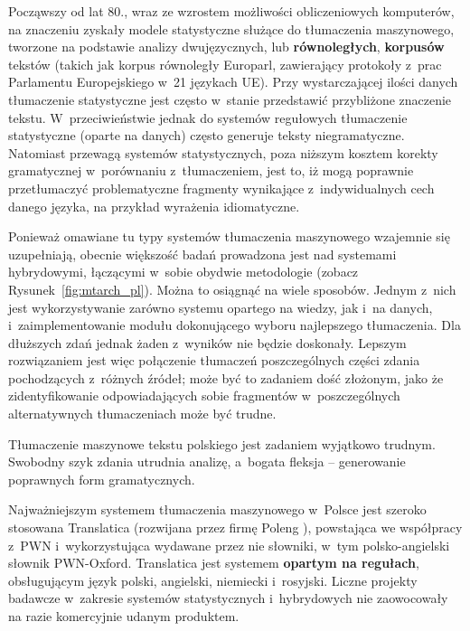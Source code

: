 \begin{multicols}{2}
Począwszy od lat 80., wraz ze wzrostem możliwości obliczeniowych
komputerów, na znaczeniu zyskały modele statystyczne służące do
tłumaczenia maszynowego, tworzone na podstawie analizy
dwujęzycznych, lub \textbf{równoległych}, \textbf{korpusów}
tekstów (takich jak korpus równoległy Europarl, zawierający
protokoły z~prac Parlamentu Europejskiego w~21 językach UE). Przy
wystarczającej ilości danych tłumaczenie statystyczne jest często
w~stanie przedstawić przybliżone znaczenie tekstu.
W~przeciwieństwie jednak do systemów regułowych tłumaczenie
statystyczne (oparte na danych) często generuje teksty
niegramatyczne. Natomiast przewagą systemów statystycznych, poza
niższym kosztem korekty gramatycznej w~porównaniu z~tłumaczeniem,
jest to, iż mogą poprawnie przetłumaczyć problematyczne fragmenty
wynikające z~indywidualnych cech danego języka, na przykład
wyrażenia idiomatyczne. 

Ponieważ omawiane tu typy systemów tłumaczenia maszynowego
wzajemnie się uzupełniają, obecnie większość badań prowadzona
jest nad systemami hybrydowymi, łączącymi w~sobie obydwie
metodologie (zobacz Rysunek~\ref{fig:mtarch_pl}). Można to
osiągnąć na wiele sposobów. Jednym z~nich jest wykorzystywanie
zarówno systemu opartego na wiedzy, jak i~na danych,
i~zaimplementowanie modułu dokonującego wyboru najlepszego
tłumaczenia. Dla dłuższych zdań jednak żaden z~wyników nie
będzie doskonały. Lepszym rozwiązaniem jest więc połączenie
tłumaczeń poszczególnych części zdania pochodzących z~różnych
źródeł; może być to zadaniem dość złożonym, jako że
zidentyfikowanie odpowiadających sobie fragmentów w~poszczególnych
alternatywnych tłumaczeniach może być trudne. 


Tłumaczenie maszynowe tekstu polskiego jest zadaniem wyjątkowo
trudnym. Swobodny szyk zdania utrudnia analizę, a~bogata fleksja –
generowanie poprawnych form gramatycznych. 

Najważniejszym systemem tłumaczenia maszynowego w~Polsce jest
szeroko stosowana Translatica (rozwijana przez firmę Poleng
\cite{Jassem2006}), powstająca we współpracy z~PWN
i~wykorzystująca wydawane przez nie słowniki, w~tym polsko-angielski
słownik PWN-Oxford. Translatica jest systemem \textbf{opartym na
regułach}, obsługującym język polski, angielski, niemiecki
i~rosyjski. Liczne projekty badawcze w~zakresie systemów
statystycznych i~hybrydowych nie zaowocowały na razie komercyjnie
udanym produktem. 


\end{multicols}
